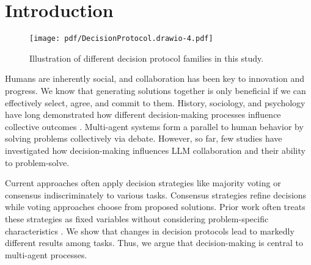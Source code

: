 \section{Introduction}
\label{sec:intro}

\begin{figure}[!ht]
    \centering
    \texttt{[image: pdf/DecisionProtocol.drawio-4.pdf]}
    \caption{Illustration of different decision protocol families in this study.
    \vspace{-0.3cm}
    }
    \label{fig:decision_protocols}
\end{figure}

Humans are inherently social, and collaboration has been key to innovation and progress. %
We know that generating solutions together is only beneficial if we can effectively select, agree, and commit to them.
History, sociology, and psychology have long demonstrated how different decision-making processes influence collective outcomes \citep{jones_comparison_1994, list_social_2022}. 
Multi-agent systems form a parallel to human behavior by solving problems collectively via debate.
However, so far, few studies have investigated how decision-making influences \ac{LLM} collaboration and their ability to problem-solve.

Current approaches often apply decision strategies like majority voting \citep{yang_llm_2024} or consensus \citep{yin_exchange--thought_2023} indiscriminately to various tasks.
Consensus strategies refine decisions while voting approaches choose from proposed solutions.
Prior work often treats these strategies as fixed variables without considering problem-specific characteristics \citep{yin_exchange--thought_2023}.
We show that changes in decision protocols lead to markedly different results among tasks.
Thus, we argue that decision-making is central to multi-agent processes.

